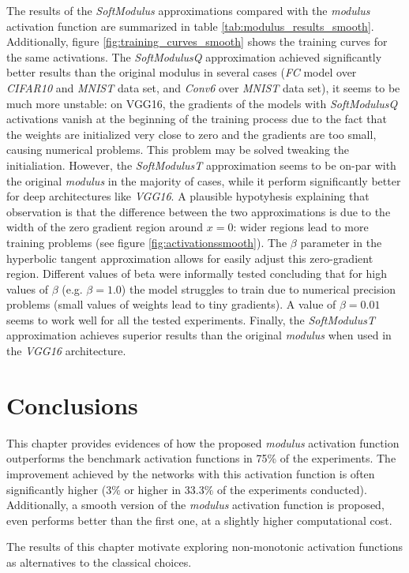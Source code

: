 The results of the \textit{SoftModulus} approximations compared with the \textit{modulus} activation function are summarized in table \ref{tab:modulus_results_smooth}. Additionally, figure \ref{fig:training_curves_smooth} shows the training curves for the same activations. The \textit{SoftModulusQ} approximation achieved significantly better results than the original modulus in several cases (\textit{FC} model over \textit{CIFAR10} and \textit{MNIST} data set, and \textit{Conv6} over \textit{MNIST} data set), it seems to be much more unstable: on VGG16, the gradients of the models with \textit{SoftModulusQ} activations vanish at the beginning of the training process due to the fact that the weights are initialized very close to zero and the gradients are too small, causing numerical problems. This problem may be solved tweaking the initialiation. However, the \textit{SoftModulusT} approximation seems to be on-par with the original \textit{modulus} in the majority of cases, while it perform significantly better for deep architectures like \textit{VGG16}. A plausible hypotyhesis explaining that observation is  that the difference between the two approximations is due to the width of the zero gradient region around $x=0$: wider regions lead to more training problems (see figure \ref{fig:activationssmooth}). The $\beta$ parameter in the hyperbolic tangent approximation allows for easily adjust this zero-gradient region. Different values of beta were informally tested concluding that for high values of $\beta$ (e.g. $\beta=1.0$) the model struggles to train due to numerical precision problems (small values of weights lead to tiny gradients). A value of $\beta=0.01$ seems to work well for all the tested experiments. Finally, the \textit{SoftModulusT} approximation achieves superior results than the original \textit{modulus} when used in the \textit{VGG16} architecture.




\section{Conclusions} \label{sec:modulus_conclusions}
This chapter provides evidences of how the proposed \textit{modulus} activation function outperforms the benchmark activation functions in 75\% of the experiments. The improvement achieved by the networks with this activation function is often significantly higher ($3\%$ or higher in 33.3$\%$ of the experiments conducted). Additionally, a smooth version of the \textit{modulus} activation function is proposed, even performs better than the first one, at a slightly higher computational cost.

The results of this chapter motivate exploring non-monotonic activation functions as alternatives to the classical choices.




